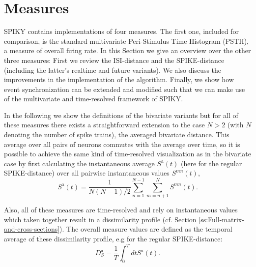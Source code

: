 \documentclass[10pt,twocolumn]{elsart5p}
\begin{document}
%
%
\section{\label{s:Measures} Measures}

SPIKY contains implementations of four measures. The first one, included for comparison, is the standard multivariate Peri-Stimulus Time Histogram (PSTH), a measure of overall firing rate. In this Section we give an overview over the other three measures: First we review the ISI-distance and the SPIKE-distance (including the latter's realtime and future variants). We also discuss the improvements in the implementation of the algorithm. Finally, we show how event synchronization can be extended and modified such that we can make use of the multivariate and time-resolved framework of SPIKY.

In the following we show the definitions of the bivariate variants but for all of these measures there exists a straightforward extension to the case $N > 2$ (with $N$ denoting the number of spike trains), the averaged bivariate distance. This average over all pairs of neurons commutes with the average over time, so it is possible to achieve the same kind of time-resolved visualization as in the bivariate case by first calculating the instantaneous average $S^{\mathrm {a}} (t)$ (here for the regular SPIKE-distance) over all pairwise instantaneous values $S^{mn} (t)$,
%
\begin{equation} \label{eq:Bivariate-Average}
    S^{\mathrm {a}} (t) = \frac{1}{N(N-1)/2}\sum_{n=1}^{N-1} \sum_{m=n+1}^N S^{mn} (t).
\end{equation}

Also, all of these measures are time-resolved and rely on instantaneous values which taken together result in a dissimilarity profile (cf. Section \ref{ss:Full-matrix-and-cross-sections}). The overall measure values are defined as the temporal average of these dissimilarity profile, e.g for the regular SPIKE-distance:
%
\begin{equation} \label{eq:Temporal-Average2}
    D_S^{\mathrm {a}} = \frac{1}{T} \int_0^T dt S^{\mathrm {a}} (t).
\end{equation}
\end{document}
